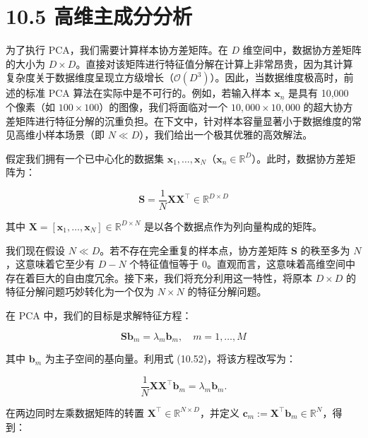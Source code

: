 \section*{10.5 高维主成分分析}
\label{sec:10.5}

为了执行 PCA，我们需要计算样本协方差矩阵。在 $ D $ 维空间中，数据协方差矩阵的大小为 $ D \times D $。直接对该矩阵进行特征值分解在计算上非常昂贵，因为其计算复杂度关于数据维度呈现立方级增长（$ \mathcal{O}(D^3) $）。因此，当数据维度极高时，前述的标准 PCA 算法在实际中是不可行的。例如，若输入样本 $ \boldsymbol{x}_n $ 是具有 10,000 个像素（如 $ 100 \times 100 $）的图像，我们将面临对一个 $ 10,000 \times 10,000 $ 的超大协方差矩阵进行特征分解的沉重负担。在下文中，针对样本容量显著小于数据维度的常见高维小样本场景（即 $ N \ll D $），我们给出一个极其优雅的高效解法。

假定我们拥有一个已中心化的数据集 $ \boldsymbol{x}_1, \ldots, \boldsymbol{x}_N $（$ \boldsymbol{x}_n \in \mathbb{R}^D $）。此时，数据协方差矩阵为：

\begin{equation}
\boldsymbol{S} = \frac{1}{N}\boldsymbol{X}\boldsymbol{X}^\top \in \mathbb{R}^{D \times D}
\tag{10.53}
\end{equation}

其中 $ \boldsymbol{X} = [\boldsymbol{x}_1, \ldots, \boldsymbol{x}_N] \in \mathbb{R}^{D \times N} $ 是以各个数据点作为列向量构成的矩阵。

我们现在假设 $ N \ll D $。若不存在完全重复的样本点，协方差矩阵 $ \boldsymbol{S} $ 的秩至多为 $ N $，这意味着它至少有 $ D - N $ 个特征值恒等于 0。直观而言，这意味着高维空间中存在着巨大的自由度冗余。接下来，我们将充分利用这一特性，将原本 $ D \times D $ 的特征分解问题巧妙转化为一个仅为 $ N \times N $ 的特征分解问题。

在 PCA 中，我们的目标是求解特征方程：

\begin{equation}
\boldsymbol{S}\boldsymbol{b}_m = \lambda_m \boldsymbol{b}_m , \quad m = 1, \ldots, M
\tag{10.54}
\end{equation}

其中 $ \boldsymbol{b}_m $ 为主子空间的基向量。利用式 (10.52)，将该方程改写为：

\begin{equation}
\frac{1}{N}\boldsymbol{X}\boldsymbol{X}^\top \boldsymbol{b}_m = \lambda_m \boldsymbol{b}_m .
\tag{10.55}
\end{equation}

在两边同时左乘数据矩阵的转置 $ \boldsymbol{X}^\top \in \mathbb{R}^{N \times D} $，并定义 $ \boldsymbol{c}_m := \boldsymbol{X}^\top \boldsymbol{b}_m \in \mathbb{R}^N $，得到：

